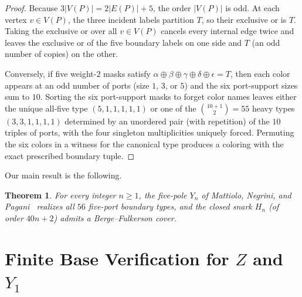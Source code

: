 \documentclass[11pt]{article}
\newtheorem{theorem}{Theorem}
\begin{document}
\begin{proof}
Because $3|V(P)| = 2|E(P)| + 5$, the order $|V(P)|$ is odd. At each vertex $v \in V(P)$,
the three incident labels partition $T$, so their exclusive or is $T$. Taking the
exclusive or over all $v \in V(P)$ cancels every internal edge twice and leaves the
exclusive or of the five boundary labels on one side and $T$ (an odd number of copies) on
the other.

Conversely, if five weight-$2$ masks satisfy
$\alpha \oplus \beta \oplus \gamma \oplus \delta \oplus \epsilon = T$, then each color
appears at an odd number of ports (size $1$, $3$, or $5$) and the six port-support sizes
sum to $10$. Sorting the six port-support masks to forget color names leaves either the
unique all-five type $(5,1,1,1,1,1)$ or one of the $\binom{10+1}{2} = 55$ heavy types
$(3,3,1,1,1,1)$ determined by an unordered pair (with repetition) of the $10$ triples of
ports, with the four singleton multiplicities uniquely forced. Permuting the six colors in
a witness for the canonical type produces a coloring with the exact prescribed boundary
tuple.
\end{proof}

Our main result is the following.

\begin{theorem}\label{thm:main}
For every integer $n \ge 1$, the five-pole $Y_n$ of Mattiolo, Negrini, and
Pagani~\cite{MNP} realizes all $56$ five-port boundary types, and the closed snark $H_n$
(of order $40n + 2$) admits a Berge--Fulkerson cover.
\end{theorem}

\section{Finite Base Verification for \texorpdfstring{$Z$}{Z} and \texorpdfstring{$Y_1$}{Y1}}
\end{document}
